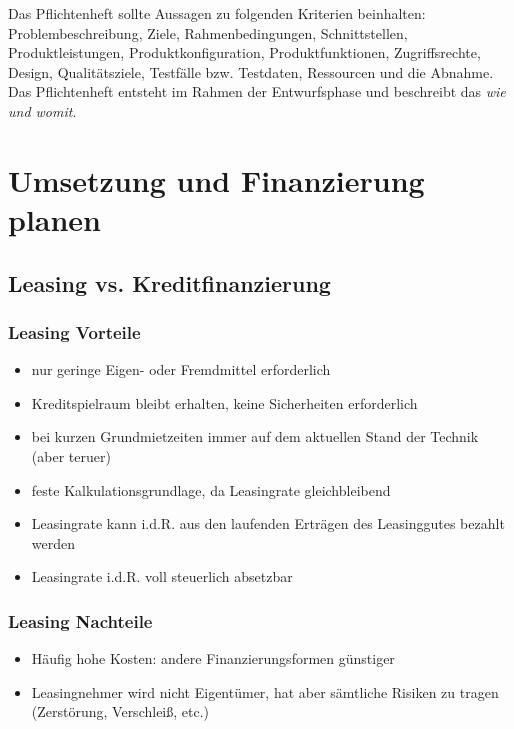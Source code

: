 \documentclass[a4paper, 12pt]{report}
\begin{document}
\begin{multicols}{2}
Das Pflichtenheft sollte Aussagen zu folgenden Kriterien beinhalten:
Problembeschreibung, Ziele, Rahmenbedingungen, Schnittstellen,
Produktleistungen, Produktkonfiguration, Produktfunktionen, Zugriffsrechte,
Design, Qualitätsziele, Testfälle bzw. Testdaten, Ressourcen und die Abnahme. \\

Das Pflichtenheft entsteht im Rahmen der Entwurfsphase und beschreibt das
\emph{wie und womit}.

\section{Umsetzung und Finanzierung planen}
\subsection{Leasing vs. Kreditfinanzierung}

\subsubsection{Leasing Vorteile}

\begin{itemize}
    \item nur geringe Eigen- oder Fremdmittel erforderlich
    \item Kreditspielraum bleibt erhalten, keine Sicherheiten erforderlich
    \item bei kurzen Grundmietzeiten immer auf dem aktuellen Stand der Technik
	(aber teruer)
    \item feste Kalkulationsgrundlage, da Leasingrate gleichbleibend
    \item Leasingrate kann i.d.R. aus den laufenden Erträgen des Leasinggutes
	bezahlt werden
    \item Leasingrate i.d.R. voll steuerlich absetzbar
\end{itemize}

\subsubsection{Leasing Nachteile}
\begin{itemize}
    \item Häufig hohe Kosten: andere Finanzierungsformen günstiger
    \item Leasingnehmer wird nicht Eigentümer, hat aber sämtliche Risiken zu
    tragen (Zerstörung, Verschleiß, etc.)
\end{itemize}


\end{multicols}
\end{document}
